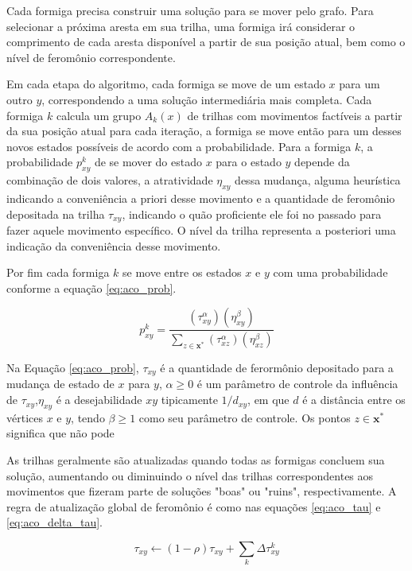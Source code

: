 Cada formiga precisa construir uma solução para se mover pelo grafo. Para selecionar a próxima aresta em sua trilha, uma formiga irá considerar o comprimento de cada aresta disponível a partir de sua posição atual, bem como o nível de feromônio correspondente.

Em cada etapa do algoritmo, cada formiga se move de um estado $\textit{x}$ para um outro $\textit{y}$, correspondendo a uma solução intermediária mais completa. Cada formiga $k$ calcula um grupo $A_{k}(x)$ de trilhas com movimentos factíveis a partir da sua posição atual para cada iteração, a formiga se move então para um desses novos estados possíveis de acordo com a probabilidade. Para a formiga $k$, a probabilidade $p_{xy}^{k}$ de se mover do estado $x$ para o estado $y$ depende da combinação de dois valores, a atratividade $\eta _{xy}$ dessa mudança, alguma heurística indicando a conveniência a priori desse movimento e a quantidade de feromônio depositada na trilha $\tau _{xy}$, indicando o quão proficiente ele foi no passado para fazer aquele movimento específico. O nível da trilha representa a posteriori uma indicação da conveniência desse movimento.

Por fim cada formiga $k$ se move entre os estados $x$ e $y$ com uma probabilidade conforme a equação \ref{eq:aco_prob}.

\begin{equation}
\label{eq:aco_prob}
    p_{xy}^k =
    \frac
    { (\tau_{xy}^{\alpha}) (\eta_{xy}^{\beta}) }
    { \sum_{z\in \mathbf{x^*}} (\tau_{xz}^{\alpha}) (\eta_{xz}^{\beta}) }
\end{equation}

Na Equação \ref{eq:aco_prob}, $\tau _{xy}$ é a quantidade de ferormônio depositado para a mudança de estado de $x$ para $y$, $\alpha \geq 0$  é um parâmetro de controle da influência de $\tau _{xy}$,$\eta _{xy}$ é a desejabilidade $xy$ tipicamente $1/d_{{xy}}$, em que $d$ é a distância entre os vértices $\textit{x}$ e $\textit{y}$, tendo $\beta  \geq 1$ como seu parâmetro de controle. Os pontos $z\in \mathbf{x^*}$ significa que não pode 

As trilhas geralmente são atualizadas quando todas as formigas concluem sua solução, aumentando ou diminuindo o nível das trilhas correspondentes aos movimentos que fizeram parte de soluções "boas" ou "ruins", respectivamente. A regra de atualização global de feromônio é como nas equações \ref{eq:aco_tau} e \ref{eq:aco_delta_tau}.

\begin{equation}
\label{eq:aco_tau}
    \tau_{xy} \leftarrow
    (1-\rho)\tau_{xy} + \sum_{k}\Delta \tau^{k}_{xy}
\end{equation}

